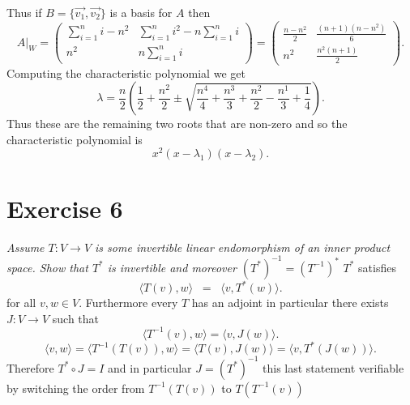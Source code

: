 \documentclass{article}
\begin{document}
     Thus if $B = \{ \vec{v_1}, \vec{v_2} \}$ is a basis for $A$ then
     \[
         A|_W = \begin{pmatrix} \sum_{i=1}^{n}i - n^2 & \sum_{i=1}^{n}i^2 - n\sum_{i=1}^{n}i \\ n^2 & n\sum_{i=1}^{n}i \end{pmatrix}  = \begin{pmatrix} \frac{n-n^2}{2} & \frac{(n+1)(n-n^2)}{6} \\ n^2 &  \frac{n^2(n+1)}{2} \end{pmatrix} 
     .\] 
     Computing the characteristic polynomial we get
     \[
     \lambda = \frac{n}{2}\left(\frac{1}{2}+\frac{n^{2}}{2} \pm \sqrt{\frac{n^{4}}{4}+\frac{n^{3}}{3}+\frac{n^{2}}{2}-\frac{n^{1}}{3}+\frac{1}{4}}\right)
     .\] 
     Thus these are the remaining two roots that are non-zero and so the characteristic polynomial is
     \[
     x^2(x-\lambda_1)(x-\lambda_2)
     .\] 

     \section{Exercise 6}
     \emph{
         Assume $T: V \rightarrow V$ is some invertible linear endomorphism of an inner product
     space. Show that $T^{*} $ is invertible and moreover $(T^{*})^{-1} = (T^{-1})^{*}$
     }
     $T^{*}$ satisfies
     \[
     \langle T(v),w \rangle \;\;=\;\; \langle v, T^{*}(w) \rangle
     .\] 
     for all $v,w \in V$.
     Furthermore every $T$ has an adjoint in particular there exists $J : V \rightarrow V$ such that
     \[
     \langle T^{-1}(v), w \rangle = \langle v, J(w) \rangle
     .\] 
     \[
     \langle v, w \rangle = \langle T^{-1}(T(v)) , w \rangle  = \langle T(v), J(w) \rangle = \langle v, T^{*}(J(w)) \rangle
     .\] 
     Therefore $T^{*} \circ J = I$ and in particular $J = (T^{*})^{-1}$ this last statement verifiable by switching
     the order from $T^{-1}(T(v))$ to $T(T^{-1}(v))$ 
\end{document}
